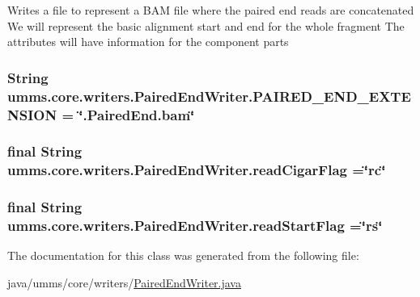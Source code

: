 Writes a file to represent a B\+A\+M file where the paired end reads are concatenated We will represent the basic alignment start and end for the whole fragment The attributes will have information for the component parts \hypertarget{classumms_1_1core_1_1writers_1_1_paired_end_writer_a47179fdb22f7088adbe4f3261169a073}{
\subsubsection[{P\+A\+I\+R\+E\+D\+\_\+\+E\+N\+D\+\_\+\+E\+X\+T\+E\+N\+S\+I\+O\+N}]{\setlength{\rightskip}{0pt plus 5cm}String umms.\+core.\+writers.\+Paired\+End\+Writer.\+P\+A\+I\+R\+E\+D\+\_\+\+E\+N\+D\+\_\+\+E\+X\+T\+E\+N\+S\+I\+O\+N = \char`\"{}.Paired\+End.\+bam\char`\"{}\hspace{0.3cm}{\ttfamily [static]}}}\label{classumms_1_1core_1_1writers_1_1_paired_end_writer_a47179fdb22f7088adbe4f3261169a073}
\hypertarget{classumms_1_1core_1_1writers_1_1_paired_end_writer_a9cb1bbd483adac9d696ce15ce4472900}{
\subsubsection[{read\+Cigar\+Flag}]{\setlength{\rightskip}{0pt plus 5cm}final String umms.\+core.\+writers.\+Paired\+End\+Writer.\+read\+Cigar\+Flag =\char`\"{}rc\char`\"{}\hspace{0.3cm}{\ttfamily [static]}}}\label{classumms_1_1core_1_1writers_1_1_paired_end_writer_a9cb1bbd483adac9d696ce15ce4472900}
\hypertarget{classumms_1_1core_1_1writers_1_1_paired_end_writer_ad1befee1e7c0717e31504e8290e34924}{
\subsubsection[{read\+Start\+Flag}]{\setlength{\rightskip}{0pt plus 5cm}final String umms.\+core.\+writers.\+Paired\+End\+Writer.\+read\+Start\+Flag =\char`\"{}rs\char`\"{}\hspace{0.3cm}{\ttfamily [static]}}}\label{classumms_1_1core_1_1writers_1_1_paired_end_writer_ad1befee1e7c0717e31504e8290e34924}


The documentation for this class was generated from the following file\+:\begin{DoxyCompactItemize}
\item 
java/umms/core/writers/\hyperlink{_paired_end_writer_8java}{Paired\+End\+Writer.\+java}\end{DoxyCompactItemize}
